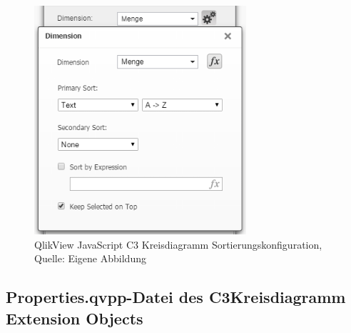 \begin{appendix}
\begin{figure}[htbp]
	\centering
		\includegraphics[width=0.70\textwidth]{img/QvPropDialog/DimensionSortierung.png}
	\caption[QlikView JavaScript C3 Kreisdiagramm Sortierungskonfiguration]{QlikView JavaScript C3 Kreisdiagramm Sortierungskonfiguration, \\Quelle: Eigene Abbildung}
	\label{fig:DimensionSortierung}
\end{figure}

\newpage
\subsection{Properties.qvpp-Datei des C3Kreisdiagramm Extension Objects} 
\label{lab:QlikViewJavascriptC3KreisdiagrammKonfigurationsdialog} 


\end{appendix}
